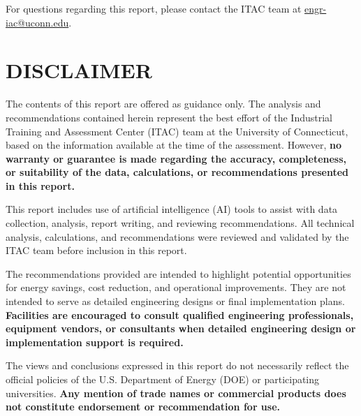 \documentclass[letterpaper,11pt,amsart,table,x11names]{article}
\begin{document}
For questions regarding this report, please contact the ITAC team at \href{mailto:engr-iac@uconn.edu}{engr-iac@uconn.edu}. \vspace{20 pt}




\section*{DISCLAIMER}
The contents of this report are offered as guidance only. The analysis and recommendations contained herein represent the best effort of the Industrial Training and Assessment Center (ITAC) team at the University of Connecticut, based on the information available at the time of the assessment. However, \textbf{no warranty or guarantee is made regarding the accuracy, completeness, or suitability of the data, calculations, or recommendations presented in this report.}

This report includes use of artificial intelligence (AI) tools to assist with data collection, analysis, report writing, and reviewing recommendations. All technical analysis, calculations, and recommendations were reviewed and validated by the ITAC team before inclusion in this report.

The recommendations provided are intended to highlight potential opportunities for energy savings, cost reduction, and operational improvements. They are not intended to serve as detailed engineering designs or final implementation plans. \textbf{Facilities are encouraged to consult qualified engineering professionals, equipment vendors, or consultants when detailed engineering design or implementation support is required.}

The views and conclusions expressed in this report do not necessarily reflect the official policies of the U.S. Department of Energy (DOE) or participating universities. \textbf{Any mention of trade names or commercial products does not constitute endorsement or recommendation for use.}


\newpage
\tableofcontents


\newpage

\newif\ifvarsonly
\varsonlytrue

\varsonlyfalse





\clearpage
\clearpage
\clearpage
\clearpage
\clearpage
\clearpage
\end{document}
